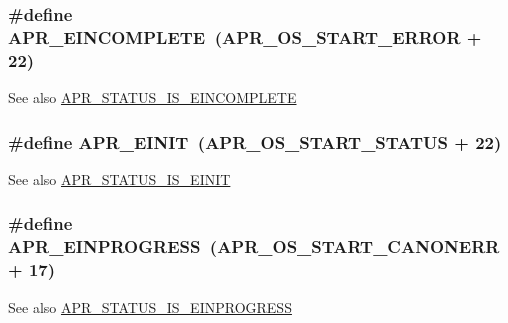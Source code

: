 \subsubsection[{\texorpdfstring{A\+P\+R\+\_\+\+E\+I\+N\+C\+O\+M\+P\+L\+E\+TE}{APR_EINCOMPLETE}}]{\setlength{\rightskip}{0pt plus 5cm}\#define A\+P\+R\+\_\+\+E\+I\+N\+C\+O\+M\+P\+L\+E\+TE~({\bf A\+P\+R\+\_\+\+O\+S\+\_\+\+S\+T\+A\+R\+T\+\_\+\+E\+R\+R\+OR} + 22)}\hypertarget{group__APR__Error_gab4357bcbdc2922183e0594865b59ce58}{}\label{group__APR__Error_gab4357bcbdc2922183e0594865b59ce58}
\begin{DoxySeeAlso}{See also}
\hyperlink{group__APR__STATUS__IS_gae7354f40a912dc43fe76ba2a59de0403}{A\+P\+R\+\_\+\+S\+T\+A\+T\+U\+S\+\_\+\+I\+S\+\_\+\+E\+I\+N\+C\+O\+M\+P\+L\+E\+TE} 
\end{DoxySeeAlso}
\subsubsection[{\texorpdfstring{A\+P\+R\+\_\+\+E\+I\+N\+IT}{APR_EINIT}}]{\setlength{\rightskip}{0pt plus 5cm}\#define A\+P\+R\+\_\+\+E\+I\+N\+IT~({\bf A\+P\+R\+\_\+\+O\+S\+\_\+\+S\+T\+A\+R\+T\+\_\+\+S\+T\+A\+T\+US} + 22)}\hypertarget{group__APR__Error_gaacd087793c97a3493eafc14075775b82}{}\label{group__APR__Error_gaacd087793c97a3493eafc14075775b82}
\begin{DoxySeeAlso}{See also}
\hyperlink{group__APR__STATUS__IS_gaeaa5fbb21b72fcbbe98b0f100d204048}{A\+P\+R\+\_\+\+S\+T\+A\+T\+U\+S\+\_\+\+I\+S\+\_\+\+E\+I\+N\+IT} 
\end{DoxySeeAlso}
\subsubsection[{\texorpdfstring{A\+P\+R\+\_\+\+E\+I\+N\+P\+R\+O\+G\+R\+E\+SS}{APR_EINPROGRESS}}]{\setlength{\rightskip}{0pt plus 5cm}\#define A\+P\+R\+\_\+\+E\+I\+N\+P\+R\+O\+G\+R\+E\+SS~({\bf A\+P\+R\+\_\+\+O\+S\+\_\+\+S\+T\+A\+R\+T\+\_\+\+C\+A\+N\+O\+N\+E\+RR} + 17)}\hypertarget{group__APR__Error_ga5c311361f4f68f289c90f3cdfd77eb79}{}\label{group__APR__Error_ga5c311361f4f68f289c90f3cdfd77eb79}
\begin{DoxySeeAlso}{See also}
\hyperlink{group__APR__STATUS__IS_ga777e9ba36fe05ac8002113a9597073ea}{A\+P\+R\+\_\+\+S\+T\+A\+T\+U\+S\+\_\+\+I\+S\+\_\+\+E\+I\+N\+P\+R\+O\+G\+R\+E\+SS} 
\end{DoxySeeAlso}
